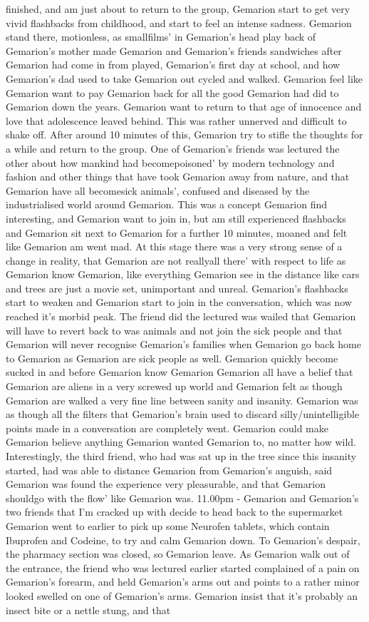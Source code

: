 \documentclass[12pt]{book}
\begin{document}
finished, and am just about to return to the group, Gemarion start to get very vivid flashbacks from childhood, and start to feel an intense sadness. Gemarion stand there, motionless, as smallfilms' in Gemarion's head play back of Gemarion's mother made Gemarion and Gemarion's friends sandwiches after Gemarion had come in from played, Gemarion's first day at school, and how Gemarion's dad used to take Gemarion out cycled and walked. Gemarion feel like Gemarion want to pay Gemarion back for all the good Gemarion had did to Gemarion down the years. Gemarion want to return to that age of innocence and love that adolescence leaved behind. This was rather unnerved and difficult to shake off. After around 10 minutes of this, Gemarion try to stifle the thoughts for a while and return to the group. One of Gemarion's friends was lectured the other about how mankind had becomepoisoned' by modern technology and fashion and other things that have took Gemarion away from nature, and that Gemarion have all becomesick animals', confused and diseased by the industrialised world around Gemarion. This was a concept Gemarion find interesting, and Gemarion want to join in, but am still experienced flashbacks and Gemarion sit next to Gemarion for a further 10 minutes, moaned and felt like Gemarion am went mad. At this stage there was a very strong sense of a change in reality, that Gemarion are not reallyall there' with respect to life as Gemarion know Gemarion, like everything Gemarion see in the distance like cars and trees are just a movie set, unimportant and unreal. Gemarion's flashbacks start to weaken and Gemarion start to join in the conversation, which was now reached it's morbid peak. The friend did the lectured was wailed that Gemarion will have to revert back to was animals and not join the sick people and that Gemarion will never recognise Gemarion's families when Gemarion go back home to Gemarion as Gemarion are sick people as well. Gemarion quickly become sucked in and before Gemarion know Gemarion Gemarion all have a belief that Gemarion are aliens in a very screwed up world and Gemarion felt as though Gemarion are walked a very fine line between sanity and insanity. Gemarion was as though all the filters that Gemarion's brain used to discard silly/unintelligible points made in a conversation are completely went. Gemarion could make Gemarion believe anything Gemarion wanted Gemarion to, no matter how wild. Interestingly, the third friend, who had was sat up in the tree since this insanity started, had was able to distance Gemarion from Gemarion's anguish, said Gemarion was found the experience very pleasurable, and that Gemarion shouldgo with the flow' like Gemarion was. 11.00pm - Gemarion and Gemarion's two friends that I'm cracked up with decide to head back to the supermarket Gemarion went to earlier to pick up some Neurofen tablets, which contain Ibuprofen and Codeine, to try and calm Gemarion down. To Gemarion's despair, the pharmacy section was closed, so Gemarion leave. As Gemarion walk out of the entrance, the friend who was lectured earlier started complained of a pain on Gemarion's forearm, and held Gemarion's arms out and points to a rather minor looked swelled on one of Gemarion's arms. Gemarion insist that it's probably an insect bite or a nettle stung, and that 
\end{document}
